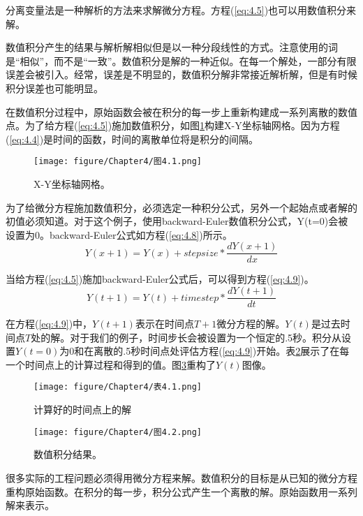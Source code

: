 分离变量法是一种解析的方法来求解微分方程。方程(\ref{eq:4.5})也可以用数值积分来解。

数值积分产生的结果与解析解相似但是以一种分段线性的方式。注意使用的词是“相似”，而不是“一致”。数值积分是解的一种近似。在每一个解处，一部分有限误差会被引入。经常，误差是不明显的，数值积分解非常接近解析解，但是有时候积分误差也可能明显。

在数值积分过程中，原始函数会被在积分的每一步上重新构建成一系列离散的数值点。为了给方程(\ref{eq:4.5})施加数值积分，如图\ref{图4.1}构建X-Y坐标轴网格。因为方程(\ref{eq:4.4})是时间的函数，时间的离散单位将是积分的间隔。
\begin{figure}[htbp]
\small
    \centering
    \texttt{[image: figure/Chapter4/图4.1.png]}
    \caption{X-Y坐标轴网格。}
    \label{图4.1}
\end{figure}

为了给微分方程施加数值积分，必须选定一种积分公式，另外一个起始点或者解的初值必须知道。对于这个例子，使用backward-Euler数值积分公式，Y(t=0)会被设置为0。backward-Euler公式如方程(\ref{eq:4.8})所示。
\begin{equation}
    Y(x+1)=Y(x)+step size * \frac{dY(x+1)}{dx}
    \label{eq:4.8}
\end{equation}

当给方程(\ref{eq:4.5})施加backward-Euler公式后，可以得到方程(\ref{eq:4.9})。
\begin{equation}
    Y(t+1)=Y(t)+timestep * \frac{dY(t+1)}{dt}
    \label{eq:4.9}
\end{equation}

在方程(\ref{eq:4.9})中，$Y(t+1)$表示在时间点$T+1$微分方程的解。$Y(t)$是过去时间点$T$处的解。对于我们的例子，时间步长会被设置为一个恒定的.5秒。积分从设置$Y(t=0)$为0和在离散的.5秒时间点处评估方程(\ref{eq:4.9})开始。表\ref{表4.1}展示了在每一个时间点上的计算过程和得到的值。图\ref{图4.2}重构了$Y(t)$图像。
\begin{figure}[htbp]
\small
    \centering
    \texttt{[image: figure/Chapter4/表4.1.png]}
    \caption{计算好的时间点上的解}
    \label{表4.1}
\end{figure}

\begin{figure}[htbp]
\small
    \centering
    \texttt{[image: figure/Chapter4/图4.2.png]}
    \caption{数值积分结果。}
    \label{图4.2}
\end{figure}

很多实际的工程问题必须得用微分方程来解。数值积分的目标是从已知的微分方程重构原始函数。在积分的每一步，积分公式产生一个离散的解。原始函数用一系列解来表示。

